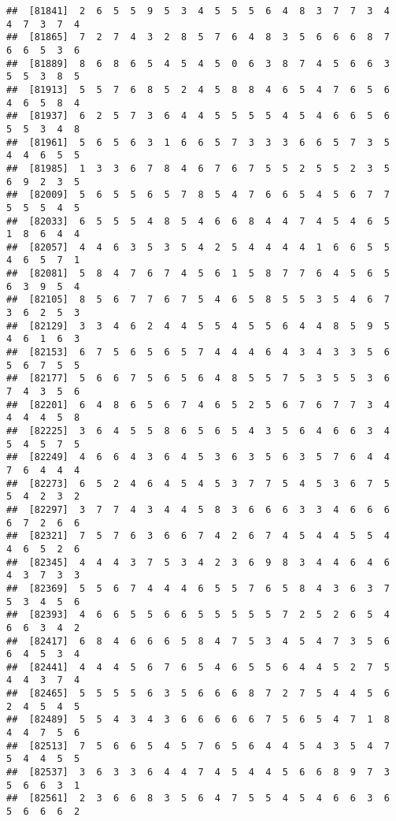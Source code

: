 \documentclass[
]{book}
\begin{document}
\begin{verbatim}
##  [81841]  2  6  5  5  9  5  3  4  5  5  5  6  4  8  3  7  7  3  4  4  7  3  7  4
##  [81865]  7  2  7  4  3  2  8  5  7  6  4  8  3  5  6  6  6  8  7  6  6  5  3  6
##  [81889]  8  6  8  6  5  4  5  4  5  0  6  3  8  7  4  5  6  6  3  5  5  3  8  5
##  [81913]  5  5  7  6  8  5  2  4  5  8  8  4  6  5  4  7  6  5  6  4  6  5  8  4
##  [81937]  6  2  5  7  3  6  4  4  5  5  5  5  4  5  4  6  6  5  6  5  5  3  4  8
##  [81961]  5  6  5  6  3  1  6  6  5  7  3  3  3  6  6  5  7  3  5  4  4  6  5  5
##  [81985]  1  3  3  6  7  8  4  6  7  6  7  5  5  2  5  5  2  3  5  6  9  2  3  5
##  [82009]  5  6  5  5  6  5  7  8  5  4  7  6  6  5  4  5  6  7  7  5  5  5  4  5
##  [82033]  6  5  5  5  4  8  5  4  6  6  8  4  4  7  4  5  4  6  5  1  8  6  4  4
##  [82057]  4  4  6  3  5  3  5  4  2  5  4  4  4  4  1  6  6  5  5  4  6  5  7  1
##  [82081]  5  8  4  7  6  7  4  5  6  1  5  8  7  7  6  4  5  6  5  6  3  9  5  4
##  [82105]  8  5  6  7  7  6  7  5  4  6  5  8  5  5  3  5  4  6  7  3  6  2  5  3
##  [82129]  3  3  4  6  2  4  4  5  5  4  5  5  6  4  4  8  5  9  5  4  6  1  6  3
##  [82153]  6  7  5  6  5  6  5  7  4  4  4  6  4  3  4  3  3  5  6  5  6  7  5  5
##  [82177]  5  6  6  7  5  6  5  6  4  8  5  5  7  5  3  5  5  3  6  7  4  3  5  6
##  [82201]  6  4  8  6  5  6  7  4  6  5  2  5  6  7  6  7  7  3  4  4  4  4  5  8
##  [82225]  3  6  4  5  5  8  6  5  6  5  4  3  5  6  4  6  6  3  4  5  4  5  7  5
##  [82249]  4  6  6  4  3  6  4  5  3  6  3  5  6  3  5  7  6  4  4  7  6  4  4  4
##  [82273]  6  5  2  4  6  4  5  4  5  3  7  7  5  4  5  3  6  7  5  5  4  2  3  2
##  [82297]  3  7  7  4  3  4  4  5  8  3  6  6  6  3  3  4  6  6  6  6  7  2  6  6
##  [82321]  7  5  7  6  3  6  6  7  4  2  6  7  4  5  4  4  5  5  4  4  6  5  2  6
##  [82345]  4  4  4  3  7  5  3  4  2  3  6  9  8  3  4  4  6  4  6  4  3  7  3  3
##  [82369]  5  5  6  7  4  4  4  6  5  5  7  6  5  8  4  3  6  3  7  5  3  4  5  6
##  [82393]  4  6  6  5  5  6  6  5  5  5  5  5  7  2  5  2  6  5  4  6  6  3  4  2
##  [82417]  6  8  4  6  6  6  5  8  4  7  5  3  4  5  4  7  3  5  6  6  4  5  3  4
##  [82441]  4  4  4  5  6  7  6  5  4  6  5  5  6  4  4  5  2  7  5  4  4  3  7  4
##  [82465]  5  5  5  5  6  3  5  6  6  6  8  7  2  7  5  4  4  5  6  2  4  5  4  5
##  [82489]  5  5  4  3  4  3  6  6  6  6  6  7  5  6  5  4  7  1  8  4  4  7  5  6
##  [82513]  7  5  6  6  5  4  5  7  6  5  6  4  4  5  4  3  5  4  7  5  4  4  5  5
##  [82537]  3  6  3  3  6  4  4  7  4  5  4  4  5  6  6  8  9  7  3  5  6  6  3  1
##  [82561]  2  3  6  6  8  3  5  6  4  7  5  5  4  5  4  6  6  3  6  5  6  6  6  2

\end{verbatim}
\end{document}
